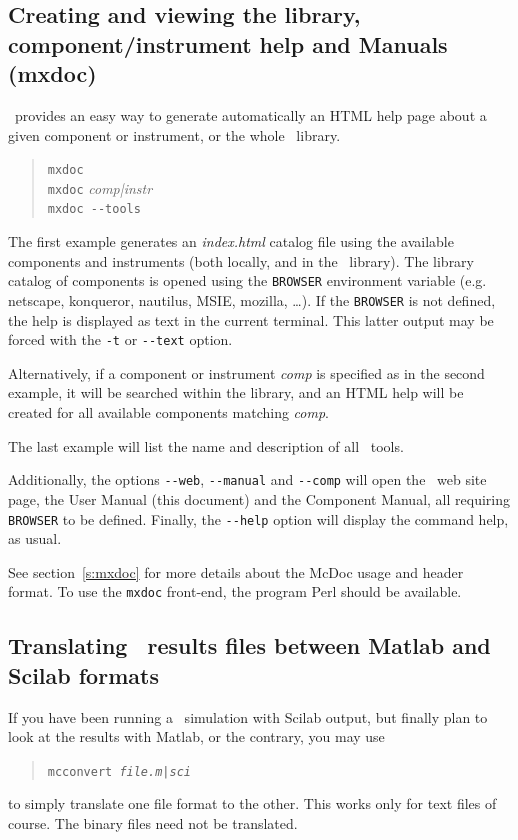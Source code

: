 \subsection{Creating and viewing the library, component/instrument help and Manuals (mxdoc)}
\label{s:mxdoc-run}

\MCX\ provides an easy way to generate automatically an HTML help page about a given component or instrument, or the whole \MCX\ library. 
\begin{quote}
  \verb|mxdoc|\\
  \verb|mxdoc| {\it comp|instr}\\
  \verb|mxdoc --tools|
\end{quote}
The first example generates an {\it index.html} catalog file using the available components and instruments (both locally, and in the \MCX\ library). The library catalog of components is opened using the \verb+BROWSER+ environment variable  (e.g. netscape, konqueror, nautilus, MSIE, mozilla, \ldots). If the \verb+BROWSER+ is not defined, the help is displayed as text in the current terminal. This latter output may be forced with the \verb+-t+ or \verb+--text+ option.

Alternatively, if a component or instrument {\it comp} is specified as in the second example, it will be searched within the library, and an HTML help will be created for all available components matching {\it comp}.

The last example will list the name and description of all \MCX\ tools.

Additionally, the options \verb+--web+, \verb+--manual+ and \verb+--comp+ will open the \MCX\ web site page, the User Manual (this document) and the Component Manual, all requiring \verb+BROWSER+ to be defined. Finally, the \verb+--help+ option will display the command help, as usual.

See section~\ref{s:mxdoc} for more details about the McDoc usage and header format.
To use the \verb+mxdoc+ front-end, the program Perl should be available.

\subsection{Translating \MCX\ results files between Matlab and Scilab formats}
\label{s:mcconvert}
 

If you have been running a \MCX\ simulation with Scilab output, but finally plan to look at the results with Matlab, or the contrary, you may use
\begin{quote}
  \texttt{mcconvert {\it file.{m|sci}\/}}
\end{quote}
to simply translate one file format to the other. This works only for text files of course. The binary files need not be translated.

